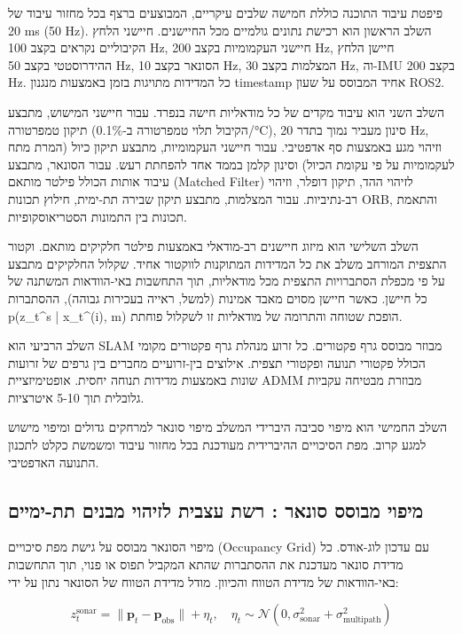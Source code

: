 פיפטת עיבוד התוכנה כוללת חמישה שלבים עיקריים, המבוצעים ברצף בכל מחזור עיבוד של 20 ms (50 Hz). השלב הראשון הוא רכישת נתונים גולמיים מכל החיישנים. חיישני הלחץ הקיבוליים נקראים בקצב 100 Hz, חיישני העקמומיות בקצב 200 Hz, חיישן הלחץ ההידרוסטטי בקצב 50 Hz, הסונאר בקצב 10 Hz, המצלמות בקצב 30 Hz, וה-IMU בקצב 200 Hz. כל המדידות מתויגות בזמן באמצעות מנגנון timestamp אחיד המבוסס על שעון ROS2.

השלב השני הוא עיבוד מקדים של כל מודאליות חישה בנפרד. עבור חיישני המישוש, מתבצע תיקון טמפרטורה (הקיבול תלוי טמפרטורה ב-0.1\%/°C), סינון מעביר נמוך בתדר 20 Hz, וזיהוי מגע באמצעות סף אדפטיבי. עבור חיישני העקמומיות, מתבצע תיקון כיול (המרת מתח לעקמומיות על פי עקומת הכיול) וסינון קלמן בממד אחד להפחתת רעש. עבור הסונאר, מתבצע עיבוד אותות הכולל פילטר מותאם (Matched Filter) לזיהוי ההד, תיקון דופלר, וזיהוי רב-נתיביות. עבור המצלמות, מתבצע תיקון שבירה תת-ימית, חילוץ תכונות ORB, והתאמת תכונות בין התמונות הסטריאוסקופיות.

השלב השלישי הוא מיזוג חיישנים רב-מודאלי באמצעות פילטר חלקיקים מותאם. וקטור התצפית המורחב משלב את כל המדידות המתוקנות לווקטור אחיד. שקלול החלקיקים מתבצע על פי מכפלת הסתברויות התצפית מכל מודאליות, תוך התחשבות באי-הוודאות המשתנה של כל חיישן. כאשר חיישן מסוים מאבד אמינות (למשל, ראייה בעכירות גבוהה), ההסתברות p(z_t^s | x_t^(i), m) הופכת שטוחה והתרומה של מודאליות זו לשקלול פוחתת.

השלב הרביעי הוא SLAM מבוזר מבוסס גרף פקטורים. כל זרוע מנהלת גרף פקטורים מקומי הכולל פקטורי תנועה ופקטורי תצפית. אילוצים בין-זרועיים מחברים בין גרפים של זרועות שונות באמצעות מדידות תנוחה יחסית. אופטימיזציית ADMM מבוזרת מבטיחה עקביות גלובלית תוך 5-10 איטרציות.

השלב החמישי הוא מיפוי סביבה היברידי המשלב מיפוי סונאר למרחקים גדולים ומיפוי מישוש למגע קרוב. מפת הסיכויים ההיברידית מעודכנת בכל מחזור עיבוד ומשמשת כקלט לתכנון התנועה האדפטיבי.

\subsection{מיפוי מבוסס סונאר : רשת עצבית לזיהוי מבנים תת-ימיים}
\label{sec:ch07_sonar_mapping}

מיפוי הסונאר מבוסס על גישת מפת סיכויים (Occupancy Grid) עם עדכון לוג-אודס. כל מדידת סונאר מעדכנת את ההסתברות שהתא המקביל תפוס או פנוי, תוך התחשבות באי-הוודאות של מדידת הטווח והכיוון. מודל מדידת הטווח של הסונאר נתון על ידי:

\begin{equation}
z_t^{\text{sonar}} = \|\mathbf{p}_t - \mathbf{p}_{\text{obs}}\| + \eta_t, \quad \eta_t \sim \mathcal{N}(0, \sigma_{\text{sonar}}^2 + \sigma_{\text{multipath}}^2)
\label{eq:ch07_sonar_model}
\end{equation}

